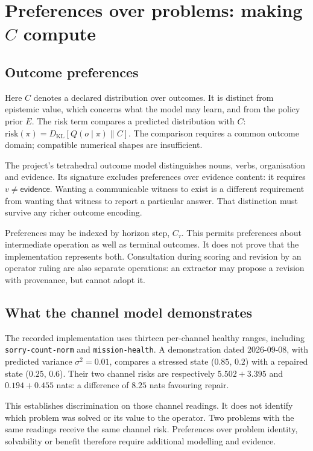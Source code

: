 \section{Preferences over problems: making $C$ compute}\label{sec:c-vector}

\subsection{Outcome preferences}\label{sec:c-intro}

Here $C$ denotes a declared distribution over outcomes. It is distinct from
epistemic value, which concerns what the model may learn, and from the policy
prior $E$. The risk term compares a predicted distribution with $C$:
$\mathrm{risk}(\pi)=D_{\mathrm{KL}}[Q(o\mid\pi)\|C]$.
The comparison requires a common outcome domain; compatible numerical shapes
are insufficient.

The project's tetrahedral outcome model distinguishes nouns, verbs,
organisation and evidence. Its signature excludes preferences over evidence
content: it requires $v\neq\mathsf{evidence}$. Wanting a communicable witness
to exist is a different requirement from wanting that witness to report a
particular answer. That distinction must survive any richer outcome encoding.

Preferences may be indexed by horizon step, $C_\tau$. This permits preferences
about intermediate operation as well as terminal outcomes. It does not prove
that the implementation represents both. Consultation during scoring and
revision by an operator ruling are also separate operations: an extractor may
propose a revision with provenance, but cannot adopt it.

\subsection{What the channel model demonstrates}\label{sec:c-simple}

The recorded implementation uses thirteen per-channel healthy ranges, including
\texttt{sorry-count-norm} and \texttt{mission-health}. A demonstration dated
2026-09-08, with predicted variance $\sigma^2=0.01$, compares a stressed state
($0.85$, $0.2$) with a repaired state ($0.25$, $0.6$). Their two channel risks
are respectively $5.502+3.395$ and $0.194+0.455$ nats: a difference of $8.25$
nats favouring repair.

This establishes discrimination on those channel readings. It does not identify
which problem was solved or its value to the operator. Two problems with the
same readings receive the same channel risk. Preferences over problem identity,
solvability or benefit therefore require additional modelling and evidence.

